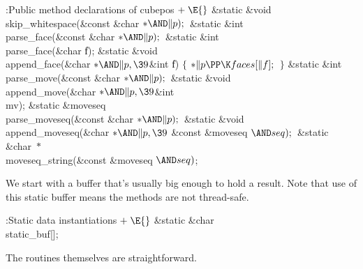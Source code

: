\Y\B\4:Public method declarations of cubepos\X${}\mathrel+\E{}$\6
\&{static} \&{void} \\{skip\_whitespace}(\&{const} \&{char} ${}{*}{\AND}%
\|p);{}$\6
\&{static} \&{int} \\{parse\_face}(\&{const} \&{char} ${}{*}{\AND}\|p);{}$\6
\&{static} \&{int} \\{parse\_face}(\&{char} \|f);\7
\&{static} \&{void} \\{append\_face}(\&{char} ${}{*}{\AND}\|p,\39{}$\&{int} %
\|f)\1\1\2\2\6
${}\{{}$\1\6
${}{*}\|p\PP\K\\{faces}[\|f];{}$\6
\4${}\}{}$\2\7
\&{static} \&{int} \\{parse\_move}(\&{const} \&{char} ${}{*}{\AND}\|p);{}$\6
\&{static} \&{void} \\{append\_move}(\&{char} ${}{*}{\AND}\|p,\39{}$\&{int} %
\\{mv});\6
\&{static} \&{moveseq} \\{parse\_moveseq}(\&{const} \&{char} ${}{*}{\AND}%
\|p);{}$\6
\&{static} \&{void} \\{append\_moveseq}(\&{char} ${}{*}{\AND}\|p,\39{}$%
\&{const} \&{moveseq} ${}{\AND}\\{seq});{}$\6
\&{static} \&{char} ${}{*}{}$\\{moveseq\_string}(\&{const} \&{moveseq} ${}{%
\AND}\\{seq}){}$;\par
\fi

We start with a buffer that's usually big enough to hold a result.
Note that use of this static buffer means the  methods
are not thread-safe.

\Y\B\4:Static data instantiations\X${}\mathrel+\E{}$\6
\&{static} \&{char} \\{static\_buf}[];\par
\fi

The routines themselves are straightforward.

